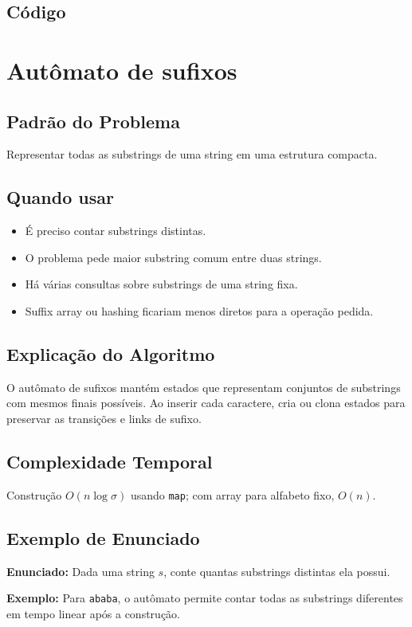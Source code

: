 \subsection{Código}

\section{Autômato de sufixos}

\subsection{Padrão do Problema}
Representar todas as substrings de uma string em uma estrutura compacta.

\subsection{Quando usar}
\begin{itemize}[nosep]
  \item É preciso contar substrings distintas.
  \item O problema pede maior substring comum entre duas strings.
  \item Há várias consultas sobre substrings de uma string fixa.
  \item Suffix array ou hashing ficariam menos diretos para a operação pedida.
\end{itemize}

\subsection{Explicação do Algoritmo}
O autômato de sufixos mantém estados que representam conjuntos de substrings com mesmos finais possíveis. Ao inserir cada caractere, cria ou clona estados para preservar as transições e links de sufixo.

\subsection{Complexidade Temporal}
Construção $O(n \log \sigma)$ usando \texttt{map}; com array para alfabeto fixo, $O(n)$.

\subsection{Exemplo de Enunciado}
\begin{exemplodiabox}
\textbf{Enunciado:} Dada uma string $s$, conte quantas substrings distintas ela possui.

\textbf{Exemplo:} Para \texttt{ababa}, o autômato permite contar todas as substrings diferentes em tempo linear após a construção.
\end{exemplodiabox}

